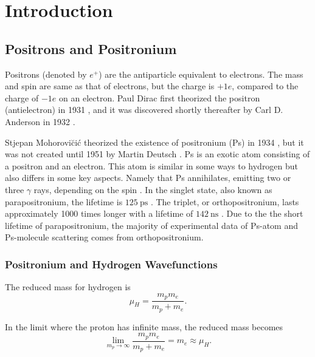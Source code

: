 \documentclass[Introduction.tex]{subfiles}
\begin{document}
\chapter{Introduction}
\label{sec:Introduction}


\section{Positrons and Positronium}
Positrons (denoted by $e^+$) are the antiparticle equivalent to electrons.  The mass and spin are same as that of electrons, but the charge is $+1e$, compared to the charge of $-1e$ on an electron. Paul Dirac first theorized the positron (antielectron) in 1931 \cite{Dirac1931}, and it was discovered shortly thereafter by Carl D. Anderson in 1932 \cite{Anderson1933}.

Stjepan Mohorovi\u{c}i\'{c} theorized the existence of positronium (Ps) in 1934 \cite{Mohorovicic1934}, but it was not created until 1951 by Martin Deutsch \cite{Deutsch1951}. Ps is an exotic atom consisting of a positron and an electron.  This atom is similar in some ways to hydrogen but also differs in some key aspects. Namely that Ps annihilates, emitting two or three $\gamma$ rays, depending on the spin \cite{Charlton2001}. In the singlet state, also known as parapositronium, the lifetime is $\SI{125}{\ps}$ \cite{Czarnecki1999}. The triplet, or orthopositronium, lasts approximately 1000 times longer with a lifetime of $\SI{142}{\ns}$ \cite{Vallery2003}. Due to the the short lifetime of parapositronium, the majority of experimental data of Ps-atom and Ps-molecule scattering comes from orthopositronium.

\subsection{Positronium and Hydrogen Wavefunctions}
The reduced mass for hydrogen is
\begin{equation}
\mu_H = \frac{m_p m_e}{m_p + m_e}.
\end{equation}

In the limit where the proton has infinite mass, the reduced mass becomes
\begin{equation}
\lim_{m_p \to \infty} \frac{m_p m_e}{m_p + m_e} = m_e \approx \mu_H.
\end{equation}
\end{document}
